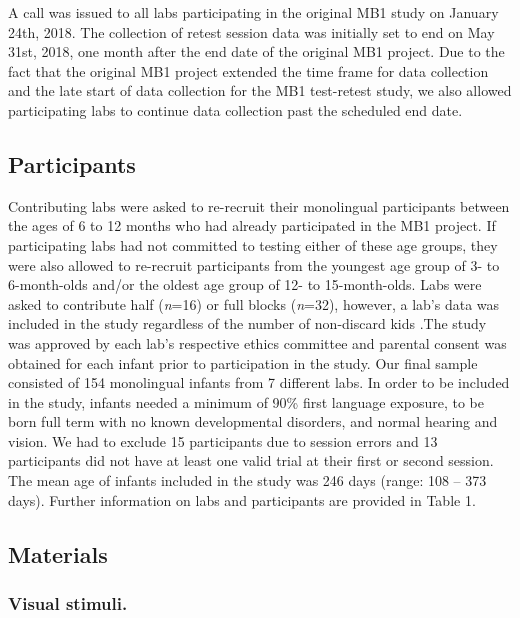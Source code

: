 \documentclass[
  english,
  man,floatsintext]{apa6}
\begin{document}
A call was issued to all labs participating in the original MB1 study on January 24th, 2018. The collection of retest session data was initially set to end on May 31st, 2018, one month after the end date of the original MB1 project. Due to the fact that the original MB1 project extended the time frame for data collection and the late start of data collection for the MB1 test-retest study, we also allowed participating labs to continue data collection past the scheduled end date.

\hypertarget{participants}{%
\subsection{Participants}\label{participants}}

Contributing labs were asked to re-recruit their monolingual participants between the ages of 6 to 12 months who had already participated in the MB1 project. If participating labs had not committed to testing either of these age groups, they were also allowed to re-recruit participants from the youngest age group of 3- to 6-month-olds and/or the oldest age group of 12- to 15-month-olds. Labs were asked to contribute half (\emph{n}=16) or full blocks (\emph{n}=32), however, a lab's data was included in the study regardless of the number of non-discard kids .The study was approved by each lab's respective ethics committee and parental consent was obtained for each infant prior to participation in the study.
Our final sample consisted of 154 monolingual infants from 7 different labs. In order to be included in the study, infants needed a minimum of 90\% first language exposure, to be born full term with no known developmental disorders, and normal hearing and vision. We had to exclude 15 participants due to session errors and 13 participants did not have at least one valid trial at their first or second session. The mean age of infants included in the study was 246 days (range: 108 -- 373 days). Further information on labs and participants are provided in Table 1.

\hypertarget{materials}{%
\subsection{Materials}\label{materials}}

\hypertarget{visual-stimuli.}{%
\subsubsection{Visual stimuli.}\label{visual-stimuli.}}
\end{document}
